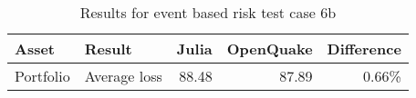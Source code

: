 \begin{table}[htbp]

\centering
\begin{tabular}{ l l r r r }

\hline
\rowcolor{anti-flashwhite}
\bf{Asset} & \bf{Result} & \bf{Julia} & \bf{OpenQuake} & \bf{Difference}\\
\hline
Portfolio & Average loss & 88.48 & 87.89 & 0.66\% \\
\hline
\end{tabular}

\caption{Results for event based risk test case 6b}
\label{tab:result-ebr-6b}
\end{table}